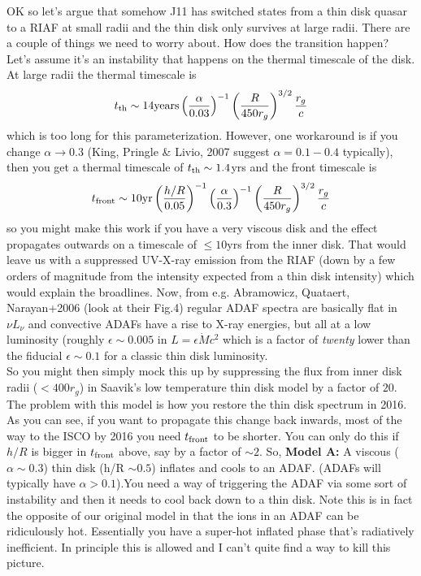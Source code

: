 \documentclass[12pt]{article}
\begin{document}
OK so let's argue that somehow J11 has switched states from a thin disk quasar to a RIAF at small radii and the thin disk only survives at large radii. There are a couple of things we need to worry about. How does the transition happen? Let's assume it's an instability that happens on the thermal timescale of the disk. At large radii the thermal timescale is 
\begin{equation}
t_{\rm th} \sim 14{\rm years} \left(\frac{\alpha}{0.03}\right)^{-1}\left(\frac{R}{450r_{g}}\right)^{3/2} \frac{r_{g}}{c}
\end{equation} 
which is too long for this parameterization. However, one workaround is if you change $\alpha \rightarrow 0.3$ (King, Pringle \& Livio, 2007 suggest $\alpha=0.1-0.4$ typically), then you get a thermal timescale of $t_{\rm th} \sim 1.4$yrs and the front timescale is
\begin{equation}
t_{\rm front} \sim  10{\rm yr} \left(\frac{h/R}{0.05}\right)^{-1}\left(\frac{\alpha}{0.3}\right)^{-1}\left(\frac{R}{450r_{g}}\right)^{3/2} \frac{r_{g}}{c}
\end{equation}
so you might make this work if you have a very viscous disk and the effect propagates outwards on a timescale of $\leq 10$yrs from the inner disk. That would leave us with a suppressed UV-X-ray emission from the RIAF (down by a few orders of magnitude from the intensity expected from a thin disk intensity) which would explain the broadlines. Now, from e.g. Abramowicz, Quataert, Narayan+2006 (look at their Fig.4) regular ADAF spectra are basically flat in $\nu L_{\nu}$ and convective ADAFs have a rise to X-ray energies, but all at a low luminosity (roughly $\epsilon \sim 0.005$ in $L=\epsilon \dot{M} c^{2}$ which is a factor of \emph{twenty} lower than the fiducial $\epsilon \sim 0.1$ for a classic thin disk luminosity.\\

So you might then simply mock this up by suppressing the flux from inner disk radii ($<400r_{g}$) in Saavik's low temperature thin disk model by a factor of $20$. The problem with this model is how you restore the thin disk spectrum in 2016. As you can see, if you want to propagate this change back inwards, most of the way to the ISCO by 2016 you need $t_{\rm front}$ to be shorter. You can only do this if $h/R$ is bigger in $t_{\rm front}$ above, say by a factor of $\sim 2$. So, 
\textbf{Model A:} A viscous ($\alpha \sim 0.3$) thin disk (h/R $\sim 0.5$) inflates and cools to an ADAF. (ADAFs will typically have $\alpha >0.1$).You need a way of triggering the ADAF via some sort of instability and then it needs to cool back down to a thin disk. Note this is in fact the opposite of our original model in that the ions in an ADAF can be ridiculously hot. Essentially you have a super-hot inflated phase that's radiatively inefficient. In principle this is allowed and I can't quite find a way to kill this picture.\\
\end{document}
